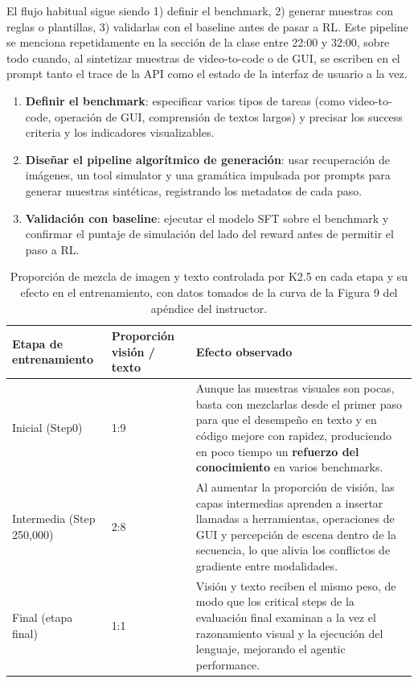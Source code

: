 El flujo habitual sigue siendo 1) definir el benchmark, 2) generar muestras con reglas o plantillas, 3) validarlas con el baseline antes de pasar a RL. Este pipeline se menciona repetidamente en la sección de la clase entre 22:00 y 32:00, sobre todo cuando, al sintetizar muestras de video-to-code o de GUI, se escriben en el prompt tanto el trace de la API como el estado de la interfaz de usuario a la vez.

\begin{enumerate}
    \item \textbf{Definir el benchmark}: especificar varios tipos de tareas (como video-to-code, operación de GUI, comprensión de textos largos) y precisar los success criteria y los indicadores visualizables.
    \item \textbf{Diseñar el pipeline algorítmico de generación}: usar recuperación de imágenes, un tool simulator y una gramática impulsada por prompts para generar muestras sintéticas, registrando los metadatos de cada paso.
    \item \textbf{Validación con baseline}: ejecutar el modelo SFT sobre el benchmark y confirmar el puntaje de simulación del lado del reward antes de permitir el paso a RL.
\end{enumerate}

\begin{table}[H]
\footnotesize
\centering
\begin{tabular}{p{3cm}p{4cm}p{7cm}}
\toprule
Etapa de entrenamiento & Proporción visión / texto & Efecto observado \\
\midrule
Inicial (Step0) & 1:9 & Aunque las muestras visuales son pocas, basta con mezclarlas desde el primer paso para que el desempeño en texto y en código mejore con rapidez, produciendo en poco tiempo un \textbf{refuerzo del conocimiento} en varios benchmarks. \\
Intermedia (Step 250,000) & 2:8 & Al aumentar la proporción de visión, las capas intermedias aprenden a insertar llamadas a herramientas, operaciones de GUI y percepción de escena dentro de la secuencia, lo que alivia los conflictos de gradiente entre modalidades. \\
Final (etapa final) & 1:1 & Visión y texto reciben el mismo peso, de modo que los critical steps de la evaluación final examinan a la vez el razonamiento visual y la ejecución del lenguaje, mejorando el agentic performance. \\
\bottomrule
\end{tabular}
\caption{Proporción de mezcla de imagen y texto controlada por K2.5 en cada etapa y su efecto en el entrenamiento, con datos tomados de la curva de la Figura 9 del apéndice del instructor.}
\end{table}

